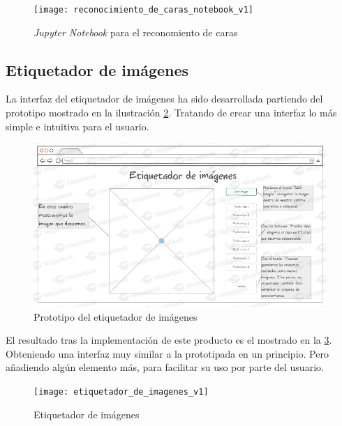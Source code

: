 \begin{figure}[h]
\centering
\texttt{[image: reconocimiento\_de\_caras\_notebook\_v1]}
\caption{\textit{Jupyter Notebook} para el reconomiento de caras}
\label{fig:C.5.1}
\end{figure}

\subsection{Etiquetador de imágenes}

La interfaz del etiquetador de imágenes ha sido desarrollada partiendo del prototipo mostrado en la ilustración \ref{fig:C.5.2}. Tratando de crear una interfaz lo más simple e intuitiva para el usuario.

\begin{figure}[h]
\centering
\includegraphics[width=0.99\textwidth]{protototipo_etiquetador_de_imagenes}
\caption{Prototipo del etiquetador de imágenes}
\label{fig:C.5.2}
\end{figure}

El resultado tras la implementación de este producto es el mostrado en la \ref{fig:C.5.3}. Obteniendo una interfaz muy similar a la prototipada en un principio. Pero añadiendo algún elemento más, para facilitar su uso por parte del usuario.

\begin{figure}[h]
\centering
\texttt{[image: etiquetador\_de\_imagenes\_v1]}
\caption{Etiquetador de imágenes}
\label{fig:C.5.3}
\end{figure}
